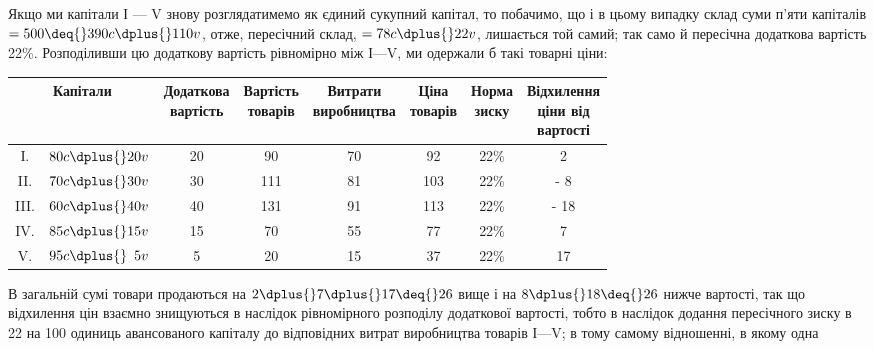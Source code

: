 
Якщо ми капітали І — V знову розглядатимемо як єдиний сукупний капітал, то побачимо, що і в цьому
випадку склад суми
п’яти капіталів $= 500 \deq{} 390 c \dplus{} 110 v$, отже, пересічний склад, $= 78 c \dplus{} 22 v$, лишається той самий;
так само й пересічна додаткова вартість \deq{} 22\%. Розподіливши цю додаткову вартість рівномірно між
І—V, ми одержали б такі товарні ціни:
\begin{center}
\begin{footnotesize}
\begin{tabular}{c@{ } c c c c c c c}
\toprule
\multicolumn{2}{c}{Капітали} &
\makecell{Додаткова\\вартість} &
\makecell{Вартість\\товарів} &
\makecell{Витрати\\виробництва} &
\makecell{Ціна\\товарів} &
\makecell{Норма\\зиску} &
\makecell{Відхилення\\ціни від\\вартості} \\
\midrule
\phantom{II}І. & $80 c \dplus{} 20 v$            & 20           & \phantom{0}90 & 70 &  \phantom{0}92 & 22\% & \dplus{} \phantom{0}2 \\
\phantom{I}II. & $70 c \dplus{} 30 v$            & 30           & 111           & 81 &  103           & 22\% & - \phantom{0}8 \\
III.           & $60 c \dplus{} 40 v$            & 40           & 131           & 91 &  113           & 22\% & - 18 \\
IV.            & $85 c \dplus{} 15 v$            & 15           & \phantom{0}70 & 55 & \phantom{0}77  & 22\% & \dplus{} \phantom{0}7 \\
\phantom{I}V.  & $95 c \dplus{} \phantom{0}5 v $ & \phantom{0}5 & \phantom{0}20 & 15 & \phantom{0}37  & 22\% & \dplus{} 17 \\
\end{tabular}
\end{footnotesize}
\end{center}
В загальній сумі товари продаються на $2 \dplus{} 7 \dplus{} 17 \deq{} 26$ вище і
на $8 \dplus{} 18 \deq{} 26$ нижче вартості, так що відхилення цін взаємно
знищуються в наслідок рівномірного розподілу додаткової вартості, тобто в наслідок додання
пересічного зиску в 22 на
100 одиниць авансованого капіталу до відповідних витрат виробництва товарів І—V; в тому самому
відношенні, в якому одна
